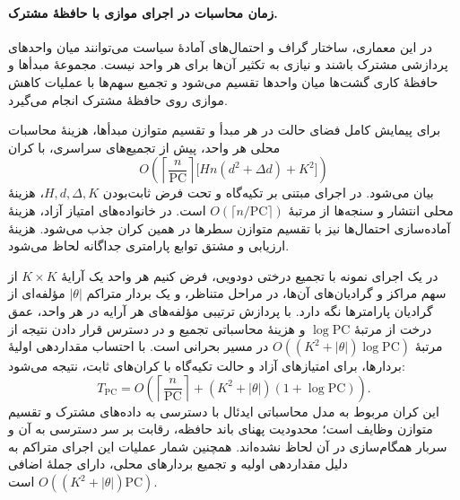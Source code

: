 \paragraph{زمان محاسبات در اجرای موازی با حافظهٔ مشترک.}
در این معماری، ساختار گراف و احتمال‌های آمادهٔ
سیاست می‌توانند میان واحدهای پردازشی مشترک
باشند و نیازی به تکثیر آن‌ها برای هر واحد نیست.
مجموعهٔ مبدأها و حافظهٔ کاری گشت‌ها میان واحدها
تقسیم می‌شود و تجمیع سهم‌ها با عملیات کاهش
موازی روی حافظهٔ مشترک انجام می‌گیرد.

برای پیمایش کامل فضای حالت در هر مبدأ
و تقسیم متوازن مبدأها، هزینهٔ محاسبات
محلی هر واحد، پیش از تجمیع‌های سراسری،
با کران
\[
O\left(\left\lceil\frac{n}{\mathrm{PC}}\right\rceil
\bigl[Hn(d^2+\Delta d)+K^2\bigr]\right)
\]
بیان می‌شود. در اجرای مبتنی بر تکیه‌گاه
و تحت فرض ثابت‌بودن $H,d,\Delta,K$،
هزینهٔ محلی انتشار و سنجه‌ها از مرتبهٔ
$O(\lceil n/\mathrm{PC}\rceil)$ است.
در خانواده‌های امتیاز آزاد، هزینهٔ آماده‌سازی
احتمال‌ها نیز با تقسیم متوازن سطرها در همین
کران جذب می‌شود. هزینهٔ ارزیابی و مشتق توابع
پارامتری جداگانه لحاظ می‌شود.

در یک اجرای نمونه با تجمیع درختی دودویی،
فرض کنیم هر واحد یک آرایهٔ $K\times K$
از سهم مراکز و گرادیان‌های آن‌ها، در مراحل
متناظر، و یک بردار متراکم $|\theta|$
مؤلفه‌ای از گرادیان پارامترها نگه دارد.
با پردازش ترتیبی مؤلفه‌های هر آرایه در
هر واحد، عمق درخت از مرتبهٔ
$\log\mathrm{PC}$ و هزینهٔ محاسباتی
تجمیع و در دسترس قرار دادن نتیجه از مرتبهٔ
$O((K^2+|\theta|)\log\mathrm{PC})$ در مسیر
بحرانی است. با احتساب مقداردهی اولیهٔ
بردارها، برای امتیازهای آزاد و حالت
تکیه‌گاه با کران‌های ثابت، نتیجه می‌شود:
\begin{equation}\label{cmp:eq:ch3-gradient-parallel-dense}
T_{\mathrm{PC}}=
O\left(
\left\lceil\frac{n}{\mathrm{PC}}\right\rceil+
(K^2+|\theta|)(1+\log\mathrm{PC})
\right).
\end{equation}
این کران مربوط به مدل محاسباتی ایدئال با
دسترسی به داده‌های مشترک و تقسیم متوازن وظایف
است؛ محدودیت پهنای باند حافظه، رقابت بر سر
دسترسی به آن و سربار همگام‌سازی در آن لحاظ
نشده‌اند. همچنین شمار عملیات این اجرای متراکم
به دلیل مقداردهی اولیه و تجمیع بردارهای محلی،
دارای جملهٔ اضافی
$O((K^2+|\theta|)\mathrm{PC})$ است.

